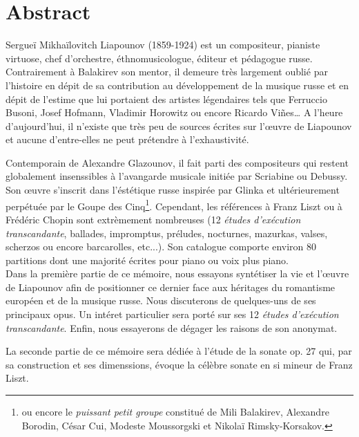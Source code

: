
\chapter*{Abstract}

Sergueï Mikhaïlovitch Liapounov (1859-1924) est un compositeur, pianiste virtuose,
chef d'orchestre, éthnomusicologue, éditeur et pédagogue russe. Contrairement à
Balakirev son mentor, il demeure très largement oublié par l'histoire en dépit
de sa contribution au développement de la musique russe et en dépit de l'estime
que lui portaient des artistes légendaires tels que Ferruccio Busoni, Josef
Hofmann, Vladimir Horowitz ou encore Ricardo Vi\~{n}es\dots{} A l'heure d'aujourd'hui,
il n'existe que très peu de sources écrites sur l'œuvre de Liapounov et aucune
d'entre-elles ne peut prétendre à l'exhaustivité.

Contemporain de Alexandre Glazounov, il fait parti des compositeurs qui restent
globalement insenssibles à l'avangarde musicale initiée par Scriabine ou Debussy.
Son œuvre s'inscrit dans l'éstétique russe inspirée par Glinka et ultérieurement
perpétuée par le Goupe des Cinq\footnote{ou encore le \emph{puissant petit groupe}
constitué de Mili Balakirev, Alexandre Borodin, César Cui, Modeste Moussorgski
et Nikolaï Rimsky-Korsakov.}. Cependant, les références à Franz Liszt ou à Frédéric
Chopin sont extrèmement nombreuses (12 \emph{études d'exécution transcandante},
ballades, impromptus, préludes, nocturnes, mazurkas, valses, scherzos ou encore
barcarolles, etc...). Son catalogue comporte environ 80 partitions dont une
majorité écrites pour piano ou voix plus piano.\\

Dans la première partie de ce mémoire, nous essayons syntétiser la vie et
l'œuvre de Liapounov afin de positionner ce dernier face aux héritages du
romantisme européen et de la musique russe. Nous discuterons de quelques-uns
de ses principaux opus. Un intéret particulier sera porté sur ses 12
\emph{études d'exécution transcandante}. Enfin, nous essayerons de dégager les
raisons de son anonymat.

La seconde partie de ce mémoire sera dédiée à l'étude de la sonate op. 27 qui,
par sa construction et ses dimenssions, évoque la célèbre sonate en si mineur
de Franz Liszt.

